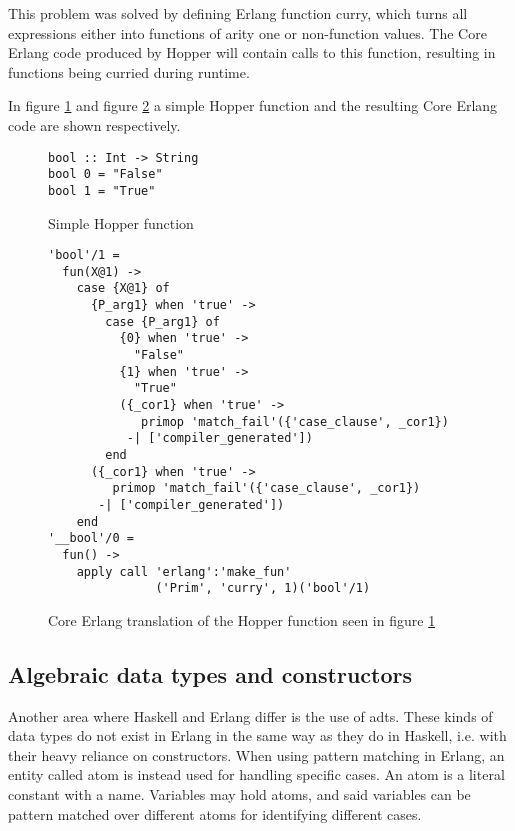 This problem was solved by defining Erlang function curry, which turns all expressions either into functions of arity one or non-function values. The Core Erlang code produced by Hopper will contain calls to this function, resulting in functions being curried during runtime.

In figure \ref{lst:hopperFun} and figure \ref{lst:coreFun} a simple Hopper function and the resulting Core Erlang code are shown respectively.

\begin{figure}[!htb]
\centering
\begin{minipage}[b]{0.38\linewidth}
\centering
\begin{lstlisting}
bool :: Int -> String
bool 0 = "False"
bool 1 = "True"
\end{lstlisting}
\end{minipage}
\caption{Simple Hopper function}
\label{lst:hopperFun}
\end{figure}

\begin{figure}[!htb]
\centering
\begin{lstlisting}
'bool'/1 =
  fun(X@1) ->
    case {X@1} of
      {P_arg1} when 'true' ->
        case {P_arg1} of
          {0} when 'true' ->
            "False"
          {1} when 'true' ->
            "True"
          ({_cor1} when 'true' ->
             primop 'match_fail'({'case_clause', _cor1})
           -| ['compiler_generated'])
        end
      ({_cor1} when 'true' ->
         primop 'match_fail'({'case_clause', _cor1})
       -| ['compiler_generated'])
    end
'__bool'/0 =
  fun() ->
    apply call 'erlang':'make_fun'
               ('Prim', 'curry', 1)('bool'/1)
\end{lstlisting}
\caption[Generated Core Erlang translation of function]
 {Core Erlang translation of the Hopper function seen in figure \ref{lst:hopperFun}}
\label{lst:coreFun}
\end{figure}

\subsection{Algebraic data types and constructors}

Another area where Haskell and Erlang differ is the use of \glspl{adt}. These kinds of data types do not exist in Erlang in the same way as they do in Haskell, i.e. with their heavy reliance
on constructors. When using pattern matching in Erlang, an entity called atom is instead used for
handling specific cases. An atom is a literal constant with a name. Variables may hold atoms, and said variables can be pattern matched over different atoms for identifying different cases.

